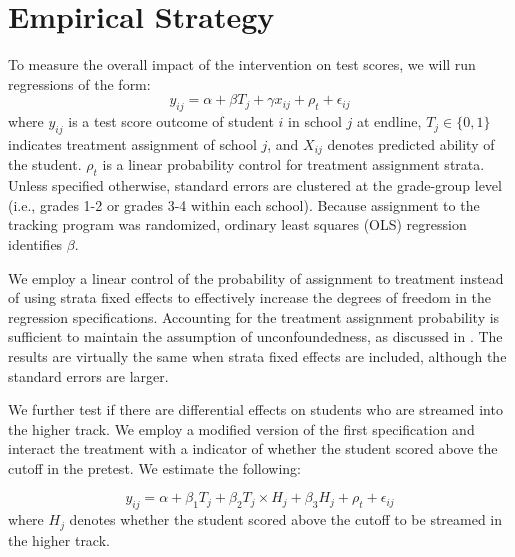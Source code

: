\documentclass[12pt]{article}
\begin{document}
\section{Empirical Strategy}
\label{sec:empirical}

To measure the overall impact of the intervention on test scores, we will run regressions of the form:
\[ y_{ij} = \alpha + \beta T_j + \gamma x_{ij}  + \rho_t +\epsilon_{ij}  \]
where $y_{ij}$ is a test score outcome of student $i$ in school $j$ at endline, $T_j \in \{0,1\}$ indicates  treatment assignment of school $j$, and $X_{ij}$ denotes predicted ability of the student. $\rho_t$ is a linear probability control for treatment assignment strata. Unless specified otherwise, standard errors are clustered at the grade-group level (i.e., grades 1-2 or grades 3-4 within each school). Because assignment to the tracking program was randomized, ordinary least squares (OLS) regression identifies $\beta$. %

We employ a linear control of the probability of assignment to treatment instead of using strata fixed effects to effectively increase the degrees of freedom in the regression specifications. Accounting for the treatment assignment probability is sufficient to maintain the assumption of unconfoundedness, as discussed in \cite{abdulkadirouglu2017research}. The results are virtually the same when strata fixed effects are included, although the standard errors are larger.

We further test if there are differential effects on students who are streamed into the higher track. We employ a modified version of the first specification and interact the treatment with a indicator of whether the student scored above the cutoff in the pretest. We estimate the following: 

\[ y_{ij} = \alpha + \beta_1 T_j + \beta_2 T_j \times H_j + \beta_3 H_j + \rho_t +\epsilon_{ij}  \]
where $H_j$ denotes whether the student scored above the cutoff to be streamed in the higher track.
\end{document}

